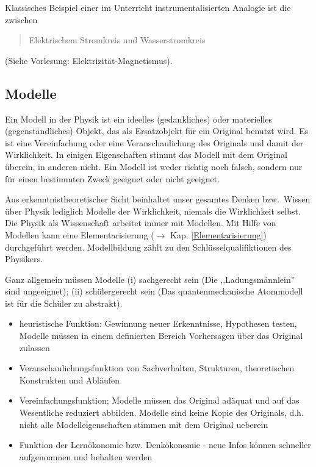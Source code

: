 Klassisches Beispiel einer im Unterricht instrumentalisierten
Analogie ist die zwischen
\begin{quote}
Elektrischem Stromkreis \q und \q Wasserstromkreis
\end{quote}
(Siehe Vorlesung: Elektrizit\"{a}t-Magnetismus).


\subsection{Modelle}

 Ein Modell in der Physik ist ein ideelles (gedankliches) oder materielles (gegenst\"{a}ndliches) Objekt, das als Ersatzobjekt f\"{u}r ein Original benutzt wird. Es ist eine Vereinfachung oder eine Veranschaulichung des Originals und damit der Wirklichkeit. In einigen Eigenschaften stimmt das Modell mit dem Original \"{u}berein, in anderen nicht. Ein Modell ist weder richtig noch falsch, sondern nur f\"{u}r einen bestimmten Zweck geeignet oder nicht geeignet.

\mip
Aus erkenntnistheoretischer Sicht beinhaltet unser gesamtes Denken bzw.\ Wissen \"{u}ber Physik lediglich Modelle der Wirklichkeit, niemals die Wirklichkeit selbst. Die Physik als Wissenschaft arbeitet immer mit Modellen. Mit Hilfe von Modellen kann eine Elementarisierung ($\to$ Kap. \ref{Elementarisierung}) durchgef\"{u}hrt werden.  Modellbildung z\"{a}hlt zu den Schl\"{u}sselqualifiktionen des Physikers.

\mip
Ganz allgemein m\"{u}ssen Modelle (i) sachgerecht sein (Die ,,Ladungsm\"{a}nnlein'' sind ungeeignet); (ii) sch\"{u}lergerecht sein (Das quantenmechanische Atommodell ist f\"{u}r die Schüler zu abstrakt). 

\bip
{}

\begin{itemize}
\item heuristische Funktion: Gewinnung neuer Erkenntnisse, Hypothesen testen, Modelle m\"{u}ssen in einem definierten Bereich Vorhersagen \"{u}ber das Original zulassen
\item Veranschaulichungsfunktion von Sachverhalten, Strukturen, theoretischen Konstrukten und Abl\"{a}ufen
\item Vereinfachungsfunktion; Modelle m\"{u}ssen das Original ad\"{a}quat und auf das Wesentliche reduziert abbilden. Modelle sind keine Kopie des Originals, d.h. nicht alle Modelleigenschaften stimmen mit dem Original ueberein
\item Funktion der Lern\"{o}konomie bzw. Denk\"{o}konomie - neue Infos k\"{o}nnen schneller aufgenommen und behalten werden 
\end{itemize}


